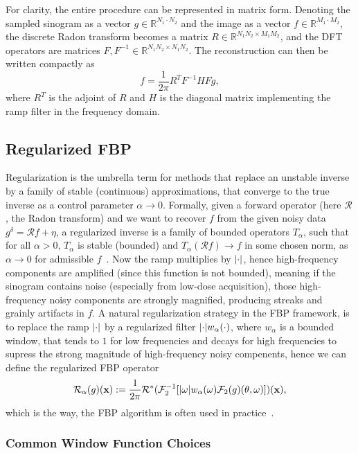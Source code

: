 \documentclass[12pt,a4paper]{article}
\begin{document}
For clarity, the entire procedure can be represented in matrix form. Denoting the sampled sinogram as a vector $g \in \mathbb{R}^{N_1 \cdot N_2}$ and the image as a vector $f \in \mathbb{R}^{M_1 \cdot M_2}$, the discrete Radon transform becomes a matrix $R \in \mathbb{R}^{N_1 N_2 \times M_1 M_2}$, and the DFT operators are matrices $F, F^{-1} \in \mathbb{R}^{N_1 N_2 \times N_1 N_2}$. The reconstruction can then be written compactly as
\[
    f = \frac{1}{2\pi} R^T F^{-1} H F g,
\]
where $R^T$ is the adjoint of $R$ and $H$ is the diagonal matrix implementing the ramp filter in the frequency domain.



\subsection{Regularized FBP}
Regularization is the umbrella term for methods that replace an unstable inverse by a family of stable (continuous) approximations, that converge to the true inverse as a control parameter $\alpha \rightarrow 0$. Formally, given a forward operator (here $\mathcal{R}$, the Radon transform) and we want to recover $f$ from the given noisy data $g^\delta = \mathcal{R}f + \eta$, a regularized inverse is a family of bounded operators $T_\alpha$, such that for all $\alpha > 0$, $T_\alpha$ is stable (bounded) and $T_\alpha (\mathcal{R}f) \rightarrow f$ in some chosen norm, as $\alpha \rightarrow 0$ for admissible $f$~\cite{math_of_ct_wald}.
\newline\newline
Now the ramp multiplies by $\abs{\cdot}$, hence high-frequency components are amplified (since this function is not bounded), meaning if the sinogram contains noise (especially from low-dose acquisition), those high-frequency noisy components are strongly magnified, producing streaks and grainly artifacts in $f$. A natural regularization strategy in the FBP framework, is to replace the ramp $\abs{\cdot}$ by a regularized filter $\abs{\cdot} w_\alpha(\cdot)$, where $w_\alpha$ is a bounded window, that tends to $1$ for low frequencies and decays for high frequencies to supress the strong magnitude of high-frequency noisy compenents, hence we can define the regularized FBP operator 
\[ \mathcal{R}_\alpha (g)(\textbf{x}) := \frac{1}{2 \pi}\mathcal{R}^* (\mathcal{F}^{-1}_2[\abs{\omega} w_\alpha(\omega) \mathcal{F}_2(g)(\theta,\omega)])(\textbf{x}), \]which is the way, the FBP algorithm is often used in practice~\cite{DeepFBP_CT}.

\subsubsection{Common Window Function Choices}
\label{281}
\end{document}
